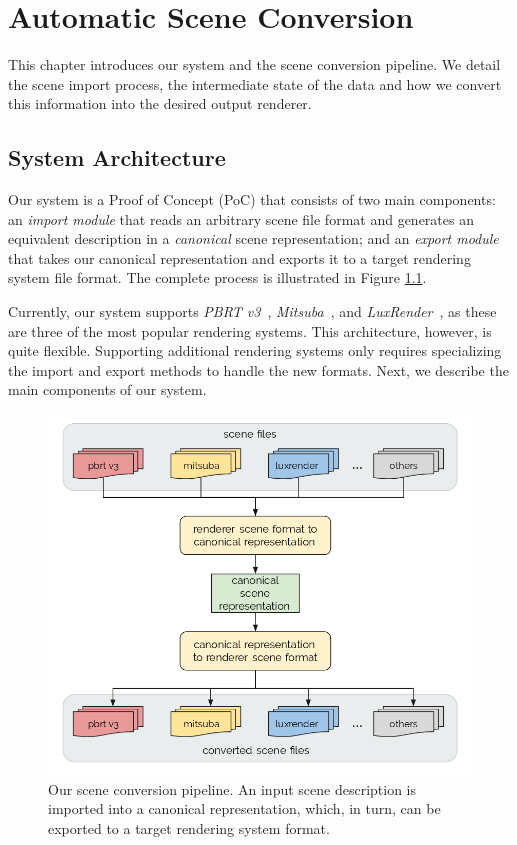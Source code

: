 \chapter{Automatic Scene Conversion} 
\label{sec:systemarch}
This chapter introduces our system and the scene conversion pipeline. We detail the scene import process, the intermediate state of the data and how we convert this information into the desired output renderer.

\section{System Architecture}
Our system is a Proof of Concept (PoC) that consists of two main components: an {\it import module} that reads an arbitrary scene file format and generates an equivalent description in a {\it canonical} scene representation; and an {\it export module} that takes our canonical representation and exports it to a target rendering system file format. The complete process is illustrated in Figure \ref{fig:sysarch}. 

Currently, our system supports \textit{PBRT v3}~\cite{PBRT:v3}, \textit{Mitsuba}~\cite{mitsuba}, and \textit{LuxRender}~\cite{luxrender}, as these are three of the most popular rendering systems. This architecture, however, is quite flexible. Supporting additional rendering systems only requires specializing the import and export methods to handle the new formats. Next, we describe the main components of our system.

\begin{figure}[h]
  \includegraphics[width=\textwidth,height=\textheight,keepaspectratio]{images/4_system_architecture/architecture.png}
  \caption{Our scene conversion pipeline. An input scene description is imported into a canonical representation, which, in turn, can be exported to a target rendering system format.}
  \label{fig:sysarch}
\end{figure}

